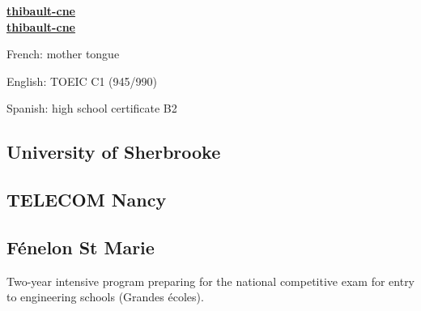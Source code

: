 \documentclass[a4paper]{MagicalCV}
\begin{document}


\begin{minipage}[t]{0.33\textwidth}


 \href{https://github.com/thibault-cne}{\bf thibault-cne} \\
 \href{https://www.linkedin.com/in/thibault-cne}{\bf thibault-cne}
\sectionsep


\begin{tightemize}
    \item French: mother tongue
    \item English: TOEIC C1 (945/990)
    \item  Spanish: high school certificate B2
\end{tightemize}

\sectionsep


\subsection{University of Sherbrooke}
\sectionsep

\subsection{TELECOM Nancy}
\sectionsep

\subsection{Fénelon St Marie}
Two-year intensive program preparing for the national competitive exam for entry to engineering schools (Grandes écoles).
\sectionsep


\end{minipage}
\end{document}
